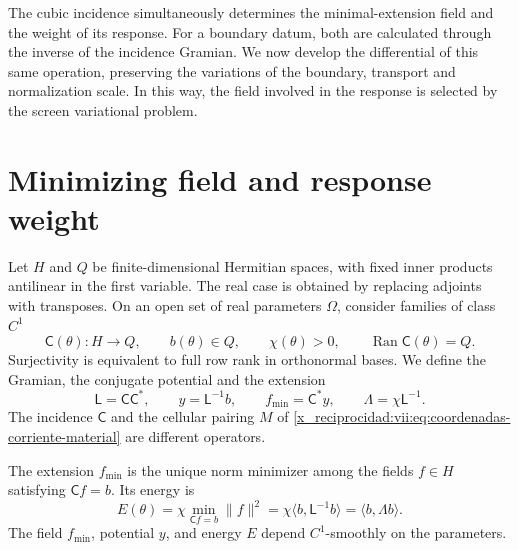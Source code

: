 The cubic incidence simultaneously determines the minimal-extension field and the weight of its response. For a boundary datum, both are calculated through the inverse of the incidence Gramian. We now develop the differential of this same operation, preserving the variations of the boundary, transport and normalization scale. In this way, the field involved in the response is selected by the screen variational problem.

\section{Minimizing field and response weight}
\label{x_reciprocidad:vii:subsec:extension-minima-parametrizada}

Let \(H\) and \(Q\) be finite-dimensional Hermitian spaces, with
fixed inner products antilinear in the first variable. The real case is
obtained by replacing adjoints with transposes. On an open set of
real parameters \(\Omega\), consider families of class \(C^1\)
\[
 \mathsf C(\theta):H\longrightarrow Q,\qquad
 b(\theta)\in Q,\qquad \chi(\theta)>0,
 \qquad \operatorname{Ran}\mathsf C(\theta)=Q.
\]
Surjectivity is equivalent to full row rank in orthonormal bases. We define the Gramian, the conjugate potential and the extension
\begin{equation}
 \mathsf L=\mathsf C\mathsf C^*,\qquad
 y=\mathsf L^{-1}b,\qquad f_{\min}=\mathsf C^*y,
 \qquad \Lambda=\chi\mathsf L^{-1}.
 \label{x_reciprocidad:vii:eq:gramiano-extension-minima}
\end{equation}
The incidence \(\mathsf C\) and the cellular pairing \(M\) of \eqref{x_reciprocidad:vii:eq:coordenadas-corriente-material} are different operators.

\begin{proposition}
\label{x_reciprocidad:vii:prop:minimo-parametrizado}
The extension \(f_{\min}\) is the unique norm minimizer among the fields \(f\in H\) satisfying \(\mathsf C f=b\). Its energy is
\begin{equation}
 E(\theta)=\chi\min_{\mathsf C f=b}\|f\|^2
 =\chi\langle b,\mathsf L^{-1}b\rangle
 =\langle b,\Lambda b\rangle.
 \label{x_reciprocidad:vii:eq:energia-extension-minima}
\end{equation}
The field \(f_{\min}\), potential \(y\), and energy \(E\)
depend \(C^1\)-smoothly on the parameters.
\end{proposition}

